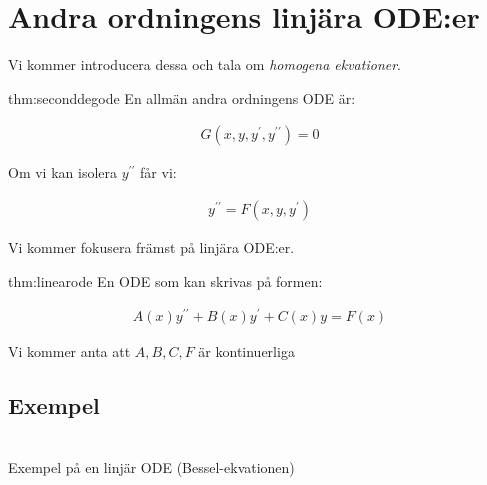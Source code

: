 \section{Andra ordningens linjära ODE:er}

\noindent Vi kommer introducera dessa och tala om \textit{homogena ekvationer}.
\par\bigskip

\begin{theo}{thm:seconddegode}
  En allmän andra ordningens ODE är:


  \begin{equation*}
    \begin{gathered}
      G(x,y,y^{\prime}, y^{\prime\prime})=0
    \end{gathered}
  \end{equation*}
  \par\bigskip
  \noindent Om vi kan isolera $y^{\prime\prime}$ får vi:


  \begin{equation*}
    \begin{gathered}
      y^{\prime\prime}=F(x,y,y^{\prime})
    \end{gathered}
  \end{equation*}
\end{theo}
\par\bigskip
\noindent Vi kommer fokusera främst på linjära ODE:er.
\par\bigskip

\begin{theo}{thm:linearode}
  En ODE som kan skrivas på formen:


  \begin{equation*}
    \begin{gathered}
      A(x)y^{\prime\prime}+B(x)y^{\prime}+C(x)y=F(x)
    \end{gathered}
  \end{equation*}
  \par\bigskip
  \noindent Vi kommer anta att $A, B, C, F$ är kontinuerliga

\end{theo}

\subsection{Exempel}\hfill\\

\noindent Exempel på en linjär ODE (Bessel-ekvationen)

